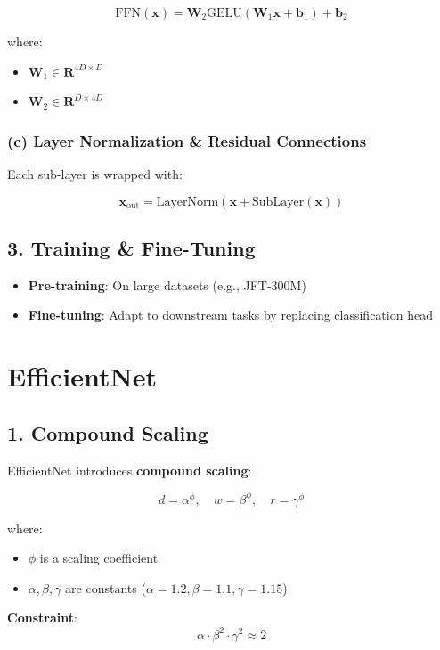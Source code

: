 \documentclass[12pt]{article}
\begin{document}
\begin{appendices}
\[
\text{FFN}(\mathbf{x}) = \mathbf{W}_2 \text{GELU}(\mathbf{W}_1 \mathbf{x} + \mathbf{b}_1) + \mathbf{b}_2
\]

where:
\begin{itemize}
    \item $\mathbf{W}_1 \in \mathbf{R}^{4D \times D}$
    \item $\mathbf{W}_2 \in \mathbf{R}^{D \times 4D}$
\end{itemize}

\subsubsection*{(c) Layer Normalization \& Residual Connections}
Each sub-layer is wrapped with:

\[
\mathbf{x}_{\text{out}} = \text{LayerNorm}(\mathbf{x} + \text{SubLayer}(\mathbf{x}))
\]

\subsection*{3. Training \& Fine-Tuning}
\begin{itemize}
    \item \textbf{Pre-training}: On large datasets (e.g., JFT-300M)
    \item \textbf{Fine-tuning}: Adapt to downstream tasks by replacing classification head
\end{itemize}

\section{EfficientNet}

\subsection*{1. Compound Scaling}
EfficientNet introduces \textbf{compound scaling}:

\[
d = \alpha^\phi, \quad w = \beta^\phi, \quad r = \gamma^\phi
\]

where:
\begin{itemize}
    \item $\phi$ is a scaling coefficient
    \item $\alpha, \beta, \gamma$ are constants ($\alpha = 1.2, \beta = 1.1, \gamma = 1.15$)
\end{itemize}

\textbf{Constraint}:
\[
\alpha \cdot \beta^2 \cdot \gamma^2 \approx 2
\]


\end{appendices}
\end{document}
